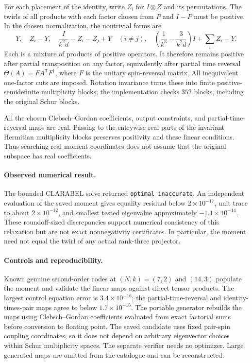\documentclass[11pt]{article}
\begin{document}
For each placement of the identity, write $Z_i$ for $I\otimes Z$ and its permutations. The twirls of all products with each factor chosen from $P$ and $I-P$ must be positive. In the chosen normalization, the nontrivial forms are
\[
Y,\quad Z_i-Y,\quad
\frac{I}{k^2d}-Z_i-Z_j+Y\quad(i\ne j),\quad
\left(\frac1{k^3}-\frac3{k^2d}\right)I+\sum_iZ_i-Y.
\]
Each is a mixture of products of positive operators. It therefore remains positive after partial transposition on any factor, equivalently after partial time reversal $\Theta(A)=FA^{\mathsf T}F^\dagger$, where $F$ is the unitary spin-reversal matrix. All inequivalent one-factor cuts are imposed. Rotation invariance turns these into finite positive-semidefinite multiplicity blocks; the implementation checks $352$ blocks, including the original Schur blocks.

All the chosen Clebsch--Gordan coefficients, output constraints, and partial-time-reversal maps are real. Passing to the entrywise real parts of the invariant Hermitian multiplicity blocks preserves positivity and these linear conditions. Thus searching real moment coordinates does not assume that the original subspace has real coefficients.

\paragraph{Observed numerical result.}
The bounded CLARABEL solve returned \texttt{optimal\_inaccurate}. An independent evaluation of the saved moment gives equality residual below $2\times10^{-17}$, unit trace to about $2\times10^{-12}$, and smallest tested eigenvalue approximately $-1.1\times10^{-14}$. These roundoff-sized discrepancies support numerical consistency of this relaxation but are not exact nonnegativity certificates. In particular, the moment need not equal the twirl of any actual rank-three projector.

\paragraph{Controls and reproducibility.}
Known genuine second-order codes at $(N,k)=(7,2)$ and $(14,3)$ populate the moment and validate the linear maps against direct tensor products. The largest control equation error is $3.4\times10^{-16}$; the partial-time-reversal and identity-times-pair maps agree to below $1.7\times10^{-16}$. The portable generator rebuilds the maps using Clebsch--Gordan coefficients evaluated from exact factorial sums before conversion to floating point. The saved candidate uses fixed pair-spin coupling coordinates, so it does not depend on arbitrary eigenvector choices within Schur multiplicity spaces. The separate verifier needs no optimizer. Large generated maps are omitted from the catalogue and can be reconstructed.
\end{document}

